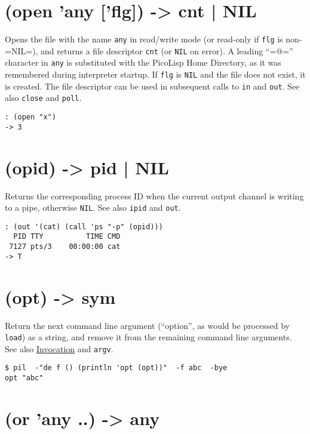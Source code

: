 {{{{{{{ 
\section{(open 'any ['flg]) -> cnt | NIL}
\label{sec-8-1-15-12}


Opens the file with the name \texttt{any} in read/write mode (or read-only if
\texttt{flg} is non-=NIL=), and returns a file descriptor \texttt{cnt} (or \texttt{NIL} on
error). A leading ``=@='' character in \texttt{any} is substituted with the
PicoLisp Home Directory, as it was remembered during interpreter
startup. If \texttt{flg} is \texttt{NIL} and the file does not exist, it is created.
The file descriptor can be used in subsequent calls to \texttt{in} and \texttt{out}.
See also \texttt{close} and \texttt{poll}.


\begin{verbatim}
: (open "x")
-> 3
\end{verbatim}

 
\section{(opid) -> pid | NIL}
\label{sec-8-1-15-13}


Returns the corresponding process ID when the current output channel is
writing to a pipe, otherwise \texttt{NIL}. See also \texttt{ipid} and \texttt{out}.


\begin{verbatim}
: (out '(cat) (call 'ps "-p" (opid)))
  PID TTY          TIME CMD
 7127 pts/3    00:00:00 cat
-> T
\end{verbatim}

 
\section{(opt) -> sym}
\label{sec-8-1-15-14}


Return the next command line argument (``option'', as would be processed
by \texttt{load}) as a string, and remove it from the remaining command line
arguments. See also \hyperref[ref.html-invoc]{Invocation} and \texttt{argv}.


\begin{verbatim}
$ pil  -"de f () (println 'opt (opt))"  -f abc  -bye
opt "abc"
\end{verbatim}

 
\section{(or 'any ..) -> any}
\label{sec-8-1-15-15}


}}}}}}}
